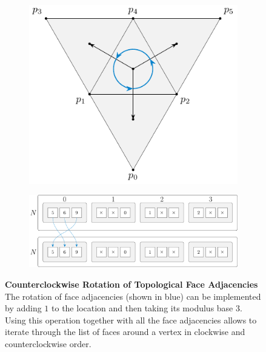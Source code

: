 \documentclass{stdlocal}
\begin{document}
  \begin{figure}
    \centering
    \begin{subfigure}[c]{0.31\linewidth}
      \centering
      \includegraphics[width=\linewidth]{figures/polyhedral-surface-triangle-adjacencies-rot.pdf}
    \end{subfigure}
    \hfill
    \begin{subfigure}[c]{0.67\linewidth}
      \centering
      \includegraphics[width=\linewidth]{figures/polyhedral-surface-triangle-adjacencies-rot-struct.pdf}
    \end{subfigure}
    \caption[Counterclockwise Rotation of Topological Face Adjacencies]{
      \textbf{Counterclockwise Rotation of Topological Face Adjacencies}\\
      The rotation of face adjacencies (shown in blue) can be implemented by adding $1$ to the location and then taking its modulus base $3$.
      Using this operation together with all the face adjacencies allows to iterate through the list of faces around a vertex in clockwise and counterclockwise order.
    }
    \label{fig:polyhedral-surface-face-adjacency-rotation}
  \end{figure}
\end{document}
